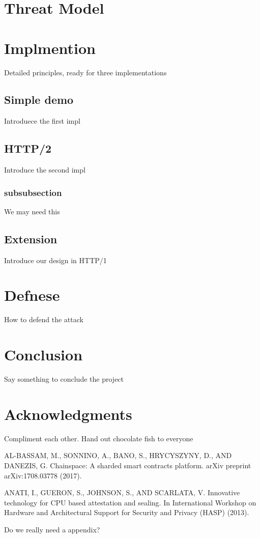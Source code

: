 \documentclass{acm_proc_article-sp}
\begin{document}
\section{Threat Model}

\section{Implmention}
Detailed principles, ready for three implementations

\subsection{Simple demo}
Introduece the first impl

\subsection{HTTP/2}
Introduce the second impl

\subsubsection{subsubsection}
We may need this

\subsection{Extension}
Introduce our design in HTTP/1

\section{Defnese}
How to defend the attack

\section{Conclusion}
Say something to conclude the project

\section{Acknowledgments}
Compliment each other. Hand out chocolate fish to everyone

\begin{thebibliography}{00}

 AL-BASSAM, M., SONNINO, A., BANO, S., HRYCYSZYNY, D., AND
    DANEZIS, G. Chainspace: A sharded smart contracts platform. arXiv
    preprint arXiv:1708.03778 (2017).

  ANATI, I., GUERON, S., JOHNSON, S., AND SCARLATA, V. Innovative
    technology for CPU based attestation and sealing. In International
    Workshop on Hardware and Architectural Support for Security and
    Privacy (HASP) (2013).

\end{thebibliography}

\appendix
Do we really need a appendix?
\end{document}
